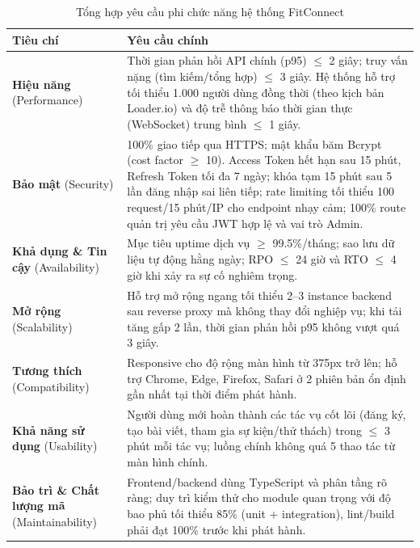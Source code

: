 \begin{table}[H]
\centering
\caption{Tổng hợp yêu cầu phi chức năng hệ thống FitConnect}\label{tab:nfr_summary}
\small
\renewcommand{\arraystretch}{1.15}
\begin{tabular}{|p{3.6cm}|p{10.4cm}|}
\hline
\textbf{Tiêu chí} & \textbf{Yêu cầu chính} \\
\hline
\textbf{Hiệu năng} (Performance) &
Thời gian phản hồi API chính (p95) $\leq$ 2 giây; truy vấn nặng (tìm kiếm/tổng hợp) $\leq$ 3 giây. Hệ thống hỗ trợ tối thiểu 1.000 người dùng đồng thời (theo kịch bản Loader.io) và độ trễ thông báo thời gian thực (WebSocket) trung bình $\leq$ 1 giây. \\
\hline
\textbf{Bảo mật} (Security) &
100\% giao tiếp qua HTTPS; mật khẩu băm Bcrypt (cost factor $\geq$ 10). Access Token hết hạn sau 15 phút, Refresh Token tối đa 7 ngày; khóa tạm 15 phút sau 5 lần đăng nhập sai liên tiếp; rate limiting tối thiểu 100 request/15 phút/IP cho endpoint nhạy cảm; 100\% route quản trị yêu cầu JWT hợp lệ và vai trò Admin. \\
\hline
\textbf{Khả dụng \& Tin cậy} (Availability) &
Mục tiêu uptime dịch vụ $\geq$ 99.5\%/tháng; sao lưu dữ liệu tự động hằng ngày; RPO $\leq$ 24 giờ và RTO $\leq$ 4 giờ khi xảy ra sự cố nghiêm trọng. \\
\hline
\textbf{Mở rộng} (Scalability) &
Hỗ trợ mở rộng ngang tối thiểu 2--3 instance backend sau reverse proxy mà không thay đổi nghiệp vụ; khi tải tăng gấp 2 lần, thời gian phản hồi p95 không vượt quá 3 giây. \\
\hline
\textbf{Tương thích} (Compatibility) &
Responsive cho độ rộng màn hình từ 375px trở lên; hỗ trợ Chrome, Edge, Firefox, Safari ở 2 phiên bản ổn định gần nhất tại thời điểm phát hành. \\
\hline
\textbf{Khả năng sử dụng} (Usability) &
Người dùng mới hoàn thành các tác vụ cốt lõi (đăng ký, tạo bài viết, tham gia sự kiện/thử thách) trong $\leq$ 3 phút mỗi tác vụ; luồng chính không quá 5 thao tác từ màn hình chính. \\
\hline
\textbf{Bảo trì \& Chất lượng mã} (Maintainability) &
Frontend/backend dùng TypeScript và phân tầng rõ ràng; duy trì kiểm thử cho module quan trọng với độ bao phủ tối thiểu 85\% (unit + integration), lint/build phải đạt 100\% trước khi phát hành. \\
\hline
\end{tabular}
\end{table}

